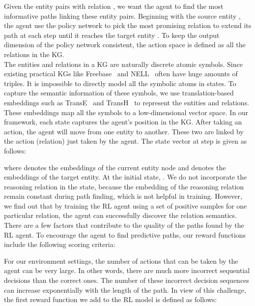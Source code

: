 \documentclass[11pt,letterpaper]{article}
\begin{document}
 Given the entity pairs  with relation , we want the agent to find the most informative paths linking these entity pairs. Beginning with the source entity , the agent use the policy network to pick the most promising relation to extend its path at each step until it reaches the target entity . To keep the output dimension of the policy network consistent, the action space is defined as all the relations in the KG.
\\

 The entities and relations in a KG are naturally discrete atomic symbols. Since existing practical KGs like Freebase~\cite{bollacker2008freebase} and NELL~\cite{carlson-aaai} often have huge amounts of triples. It is impossible to directly model all the symbolic atoms in states. To capture the semantic information of these symbols, we use translation-based embeddings such as TransE~\cite{bordes2013translating} and TransH~\cite{wang2014knowledge} to represent the entities and relations. These embeddings map all the symbols to a low-dimensional vector space. In our framework, each state captures the agent's position in the KG. After taking an action, the agent will move from one entity to another. These two are linked by the action (relation) just taken by the agent. The state vector at step  is given as follows:

where  denotes the embeddings of the current entity node and  denotes the embeddings of the target entity. At the initial state, . We do not incorporate the reasoning relation in the state, because the embedding of the reasoning relation remain constant during path finding, which is not helpful in training. However, we find out that by training the RL agent using a set of positive samples for one particular relation, the agent can successfully discover the relation semantics.
\\

 There are a few factors that contribute to the quality of the paths found by the RL agent. To encourage the agent to find predictive paths, our reward functions include the following scoring criteria:

For our environment settings, the number of actions that can be taken by the agent can be very large. In other words, there are much more incorrect sequential decisions than the correct ones. The number of these incorrect decision sequences can increase exponentially with the length of the path. In view of this challenge, the first reward function we add to the RL model is defined as follows:
\end{document}

